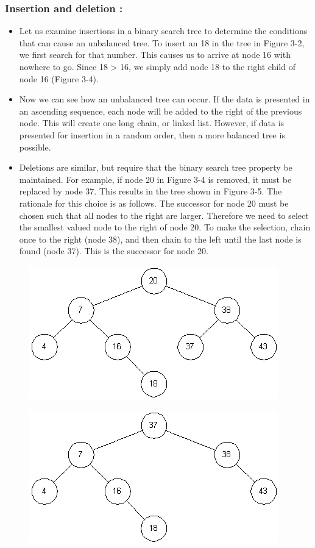 \documentclass{article}
\begin{document}
\begin{itemize}
    	\subsubsection{Insertion and deletion : }
        \begin{itemize}
			\item Let us examine insertions in a binary search tree to determine the conditions that can cause an unbalanced tree. To insert an 18 in the tree in Figure 3-2, we first search for that number. This causes us to arrive at node 16 with nowhere to go. Since 18 > 16, we simply add node 18 to the right child of node 16 (Figure 3-4). 
            \item Now we can see how an unbalanced tree can occur. If the data is presented in an ascending sequence, each node will be added to the right of the previous node. This will create one long chain, or linked list. However, if data is presented for insertion in a random order, then a more balanced tree is possible. 
            \item Deletions are similar, but require that the binary search tree property be maintained. For example, if node 20 in Figure 3-4 is removed, it must be replaced by node 37. This results in the tree shown in Figure 3-5. The rationale for this choice is as follows. The successor for node 20 must be chosen such that all nodes to the right are larger. Therefore we need to select the smallest valued node to the right of node 20. To make the selection, chain once to the right (node 38), and then chain to the left until the last node is found (node 37). This is the successor for node 20. 
		\end{itemize}
	\end{itemize}
   	   	\begin{figure}
        \centering
			\includegraphics[scale = 0.8]{A1_03}
		\end{figure}
   	   	\begin{figure}
        \centering
			\includegraphics[scale = 0.8]{A1_04}
		\end{figure}
\end{document}

